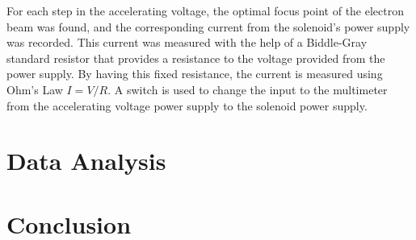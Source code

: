 \documentclass[%
 aip,
 amsmath,amssymb,
 reprint,%
floatfix,
]{revtex4-1}
\begin{document}
For each step in the accelerating voltage, the optimal focus point of the electron beam was found, and the corresponding current from the solenoid's power supply was recorded. This current was measured with the help of a Biddle-Gray standard resistor that provides a resistance to the voltage provided from the power supply. By having this fixed resistance, the current is measured using Ohm's Law $I=V/R$. A switch is used to change the input to the multimeter from the accelerating voltage power supply to the solenoid power supply.

\section{\label{sec:level4}Data Analysis}

\section{\label{sec:level5}Conclusion}

\nocite{*}
\end{document}

